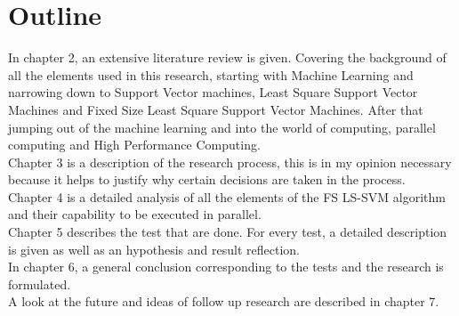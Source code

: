 \section{Outline}
In chapter 2, an extensive literature review is given. 
Covering the background of all the elements used in this research, starting with Machine Learning and narrowing down to Support Vector machines, Least Square Support Vector Machines and Fixed Size Least Square Support Vector Machines. After that jumping out of the machine learning and into the world of computing, parallel computing and High Performance Computing.\\
Chapter 3 is a description of the research process, this is in my opinion necessary because it helps to justify why certain decisions are taken in the process.\\
Chapter 4 is a detailed analysis of all the elements of the FS LS-SVM algorithm and their capability to be executed in parallel.\\
Chapter 5 describes the test that are done. For every test, a detailed description is given as well as an hypothesis and result reflection.\\
In chapter 6, a general conclusion corresponding to the tests and the research is formulated.\\
A look at the future and ideas of follow up research are described in chapter 7.